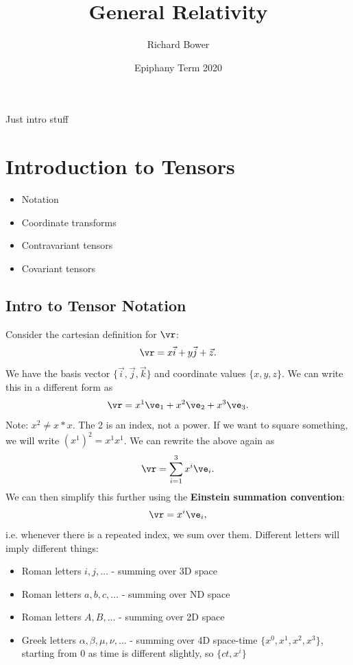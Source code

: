 \documentclass[a4paper, 11pt, normalem]{report}
\title{General Relativity \vspace{-20pt}}
\author{Richard Bower}
\date{\vspace{-15pt}Epiphany Term 2020}
\begin{document}
\maketitle
\tableofcontents
\chapter{}
Just intro stuff

\chapter{Introduction to Tensors}
\begin{itemize}
    \item Notation
    \item Coordinate transforms
    \item Contravariant tensors
    \item Covariant tensors
\end{itemize}

\section{Intro to Tensor Notation}
Consider the cartesian definition for $\vr$:
\begin{align}
    \vr = x\vec{i} + y\vec{j} + \vec{z}.
\end{align}
We have the basis vector $\{\vec{i},\vec{j},\vec{k}\}$ and coordinate values $\{x,y,z\}$.
We can write this in a different form as
\begin{align}
    \vr = x^1\ve_1 + x^2\ve_2 + x^3\ve_3.
\end{align}
Note: $x^2 \neq x*x$.
The 2 is an index, not a power. 
If we want to square something, we will write $(x^1)^2 = x^1x^1$.
We can rewrite the above again as
\begin{align}
    \vr = \sum_{i=1}^3 x^i\ve_i.
\end{align}
We can then simplify this further using the \textbf{Einstein summation convention}:
\begin{align}
    \vr = x^i\ve_i,
\end{align}
i.e. whenever there is a repeated index, we sum over them. 
Different letters will imply different things:
\begin{itemize}
    \item Roman letters $i,j,\dots$ - summing over 3D space
    \item Roman letters $a,b,c,\dots$ - summing over ND space
    \item Roman letters $A,B,\dots$ - summing over 2D space
    \item Greek letters $\alpha,\beta,\mu,\nu,\dots$ - summing over 4D space-time $\{x^0,x^1,x^2,x^3\}$, starting from 0 as time is different slightly, so $\{ct,x^i\}$
\end{itemize}
\end{document}
